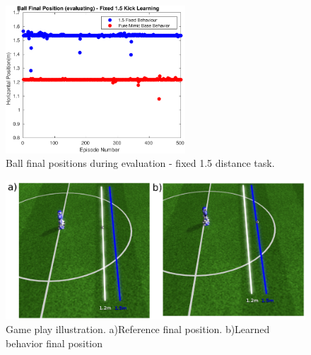 \begin{figure}[H]
    \centering
    \includegraphics[width=0.6\textwidth]{Chapter7/plots/plot_ball_pos_15fix_kick_eval.pdf} 
    \caption{Ball final positions during evaluation - fixed 1.5 distance task.}
    \label{fig:RL_15_kick_pos_eval}
\end{figure}

\begin{figure}[H]
    \centering
    \includegraphics[width=1.0\textwidth]{Chapter7/figures/kick_train_15.pdf} 
    \caption{Game play illustration. a)Reference final position. b)Learned behavior final position}
    \label{fig:RL_15_kick_roboviz}
\end{figure}






